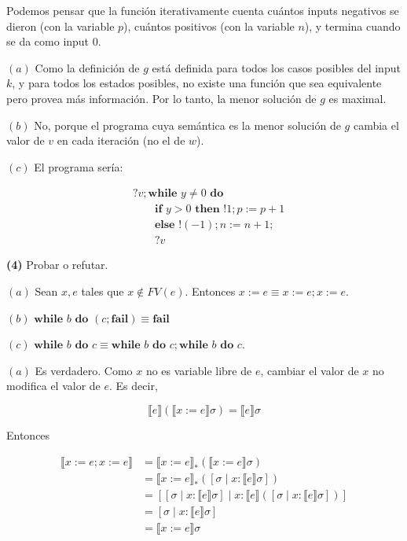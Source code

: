 \documentclass[a4paper, 12pt]{article}
\begin{document}
Podemos pensar que la función iterativamente cuenta cuántos inputs negativos se
dieron (con la variable $p$), cuántos positivos (con la variable $n$), y termina
cuando se da como input $0$.

$(a)$ Como la definición de $g$ está definida para todos los casos posibles del
input $k$, y para todos los estados posibles, no existe una función que sea
equivalente pero provea más información. Por lo tanto, la menor solución de $g$ es maximal.

$(b)$ No, porque el programa cuya semántica es la menor solución de $g$ cambia
el valor de $v$ en cada iteración (no el de $w$).

$(c)$ El programa sería:

\begin{align*}
  &?v;\textbf{while } y \neq 0 \textbf{ do } \\ 
  &\qquad \textbf{if } y > 0 \textbf{ then } !1; p := p+1 \\
  &\qquad\textbf{else } !(-1); n := n + 1; \\ 
  &\qquad?v
\end{align*}

\pagebreak 

\begin{myframe}
  \textbf{(4)} Probar o refutar. 

  $(a)$ Sean $x, e$ tales que $x \not\in FV(e)$. Entonces $x := e \equiv x := e; x := e$. 

  $(b)$ $\textbf{while } b \textbf{ do } ( c;\textbf{fail} ) \equiv \textbf{fail}$

  $(c)$ $\textbf{while } b \textbf{ do } c \equiv \textbf{while } b \textbf{ do
  } c; \textbf{while } b \textbf{ do } c$.
\end{myframe}

$(a)$ Es verdadero. Como $x$ no es variable libre de $e$, cambiar el valor de
$x$ no modifica el valor de $e$. Es decir, 

\begin{equation*}
  \llbracket e \rrbracket\left( \llbracket x := e \rrbracket\sigma \right) =
  \llbracket e \rrbracket\sigma
\end{equation*}

Entonces 

\begin{align*}
  \llbracket x := e ; x :=e \rrbracket 
  &= \llbracket x := e \rrbracket_* \left( \llbracket x:=e \rrbracket\sigma
  \right)  \\ 
  &=\llbracket x:=e \rrbracket_* \left( [\sigma \mid x : \llbracket e
  \rrbracket\sigma] \right)  \\ 
  &=\left[ [\sigma \mid x : \llbracket e \rrbracket \sigma] \mid x : \llbracket
  e\rrbracket([\sigma \mid x : \llbracket e \rrbracket\sigma])\right]  \\ 
  &= \left[ \sigma \mid x : \llbracket e \rrbracket\sigma \right]  \\ 
  &= \llbracket x := e \rrbracket\sigma
\end{align*}
\end{document}
